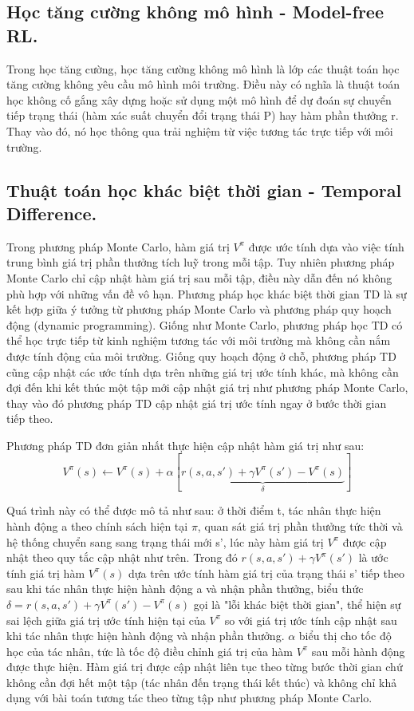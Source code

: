\documentclass{uetgraduation}
\begin{document}
\subsection{Học tăng cường không mô hình - Model-free RL.}
Trong học tăng cường, học tăng cường không mô hình là lớp các thuật toán học tăng cường không yêu cầu mô hình môi trường. Điều này có nghĩa là thuật toán học
không cố gắng xây dựng hoặc sử dụng một mô hình để dự đoán sự chuyển tiếp trạng thái (hàm xác suất chuyển đổi trạng thái P) hay hàm phần thưởng r. Thay vào đó, nó học thông
qua trải nghiệm từ việc tương tác trực tiếp với môi trường.

\subsection{Thuật toán học khác biệt thời gian - Temporal Difference.}
Trong phương pháp Monte Carlo, hàm giá trị $V^\pi$ được ước tính dựa vào việc tính trung bình giá trị phần thưởng tích luỹ trong mỗi tập. Tuy nhiên phương pháp Monte Carlo chỉ cập nhật
hàm giá trị sau mỗi tập, điều này dẫn đến nó không phù hợp với những vấn đề vô hạn. Phương pháp học khác biệt thời gian TD là sự kết hợp giữa ý tưởng từ phương pháp Monte Carlo và
phương pháp quy hoạch động (dynamic programming). Giống như Monte Carlo, phương pháp học TD có thể học trực tiếp từ kinh nghiệm tương tác với môi trường mà không cần nắm được tính
động của môi trường. Giống quy hoạch động ở chỗ, phương pháp TD cũng cập nhật các ước tính dựa trên những giá trị ước tính khác, mà không cần đợi đến khi kết thúc một tập mới cập
nhật giá trị như phương pháp Monte Carlo, thay vào đó phương pháp TD cập nhật giá trị ước tính ngay ở bước thời gian tiếp theo.

Phương pháp TD đơn giản nhất thực hiện cập nhật hàm giá trị như sau:
\[
V^\pi (s) \leftarrow V^\pi (s) + \alpha [\underbrace{r(s, a, s') + \gamma V^\pi (s') - V^\pi (s)}_\delta]
\]

Quá trình này có thể được mô tả như sau: ở thời điểm t, tác nhân thực hiện hành động a theo chính sách hiện tại $\pi$, quan sát giá trị phần thưởng tức thời và hệ thống chuyển sang
sang trạng thái mới s', lúc này hàm giá trị $V^\pi$ được cập nhật theo quy tắc cập nhật như trên. Trong đó $r(s, a, s') + \gamma V^\pi (s')$ là ước tính giá trị hàm $V^\pi (s)$ dựa
trên ước tính hàm giá trị của trạng thái s' tiếp theo sau khi tác nhân thực hiện hành động a và nhận phần thưởng, biểu thức $\delta = r(s, a, s') + \gamma V^\pi (s') - V^\pi (s)$ gọi là "lỗi khác biệt thời gian", 
thể hiện sự sai lệch giữa giá trị ước tính hiện tại của $V^\pi$ so với giá trị ước tính cập nhật sau khi tác nhân thực hiện hành động và nhận phần thưởng. $\alpha$ biểu thị cho tốc
độ học của tác nhân, tức là tốc độ điều chỉnh giá trị của hàm $V^\pi$ sau mỗi hành động được thực hiện. Hàm giá trị được cập nhật liên tục theo từng bước thời gian chứ không cần đợi
hết một tập (tác nhân đến trạng thái kết thúc) và không chỉ khả dụng với bài toán tương tác theo từng tập như phương pháp Monte Carlo.
\end{document}
